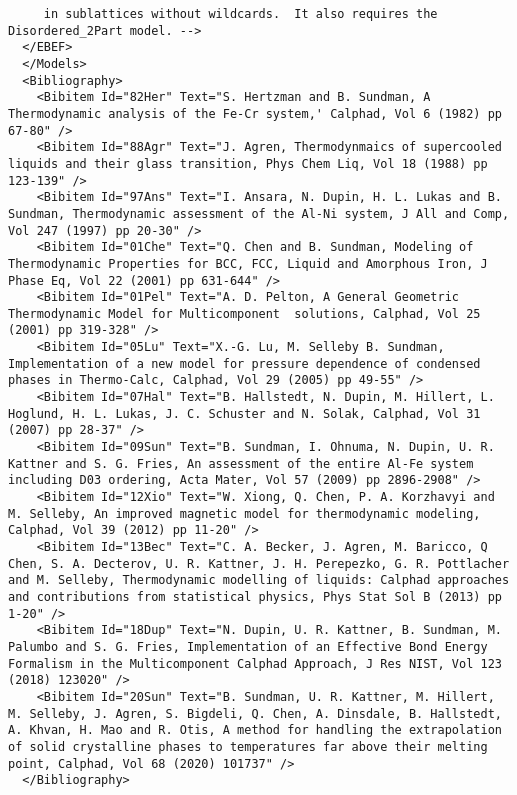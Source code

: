 \documentclass{article}
\begin{document}
\begin{appendices}
{\begin{verbatim}
     in sublattices without wildcards.  It also requires the Disordered_2Part model. -->
  </EBEF>
  </Models>
  <Bibliography> 
    <Bibitem Id="82Her" Text="S. Hertzman and B. Sundman, A Thermodynamic analysis of the Fe-Cr system,' Calphad, Vol 6 (1982) pp 67-80" />
    <Bibitem Id="88Agr" Text="J. Agren, Thermodynmaics of supercooled liquids and their glass transition, Phys Chem Liq, Vol 18 (1988) pp 123-139" />
    <Bibitem Id="97Ans" Text="I. Ansara, N. Dupin, H. L. Lukas and B. Sundman, Thermodynamic assessment of the Al-Ni system, J All and Comp, Vol 247 (1997) pp 20-30" />
    <Bibitem Id="01Che" Text="Q. Chen and B. Sundman, Modeling of Thermodynamic Properties for BCC, FCC, Liquid and Amorphous Iron, J Phase Eq, Vol 22 (2001) pp 631-644" />
    <Bibitem Id="01Pel" Text="A. D. Pelton, A General Geometric Thermodynamic Model for Multicomponent  solutions, Calphad, Vol 25 (2001) pp 319-328" />
    <Bibitem Id="05Lu" Text="X.-G. Lu, M. Selleby B. Sundman, Implementation of a new model for pressure dependence of condensed phases in Thermo-Calc, Calphad, Vol 29 (2005) pp 49-55" />
    <Bibitem Id="07Hal" Text="B. Hallstedt, N. Dupin, M. Hillert, L. Hoglund, H. L. Lukas, J. C. Schuster and N. Solak, Calphad, Vol 31 (2007) pp 28-37" />
    <Bibitem Id="09Sun" Text="B. Sundman, I. Ohnuma, N. Dupin, U. R. Kattner and S. G. Fries, An assessment of the entire Al-Fe system including D03 ordering, Acta Mater, Vol 57 (2009) pp 2896-2908" />
    <Bibitem Id="12Xio" Text="W. Xiong, Q. Chen, P. A. Korzhavyi and M. Selleby, An improved magnetic model for thermodynamic modeling, Calphad, Vol 39 (2012) pp 11-20" />
    <Bibitem Id="13Bec" Text="C. A. Becker, J. Agren, M. Baricco, Q Chen, S. A. Decterov, U. R. Kattner, J. H. Perepezko, G. R. Pottlacher and M. Selleby, Thermodynamic modelling of liquids: Calphad approaches and contributions from statistical physics, Phys Stat Sol B (2013) pp 1-20" />
    <Bibitem Id="18Dup" Text="N. Dupin, U. R. Kattner, B. Sundman, M. Palumbo and S. G. Fries, Implementation of an Effective Bond Energy Formalism in the Multicomponent Calphad Approach, J Res NIST, Vol 123 (2018) 123020" />
    <Bibitem Id="20Sun" Text="B. Sundman, U. R. Kattner, M. Hillert, M. Selleby, J. Agren, S. Bigdeli, Q. Chen, A. Dinsdale, B. Hallstedt, A. Khvan, H. Mao and R. Otis, A method for handling the extrapolation of solid crystalline phases to temperatures far above their melting point, Calphad, Vol 68 (2020) 101737" />
  </Bibliography>

\end{verbatim}
}


\end{appendices}
\end{document}
